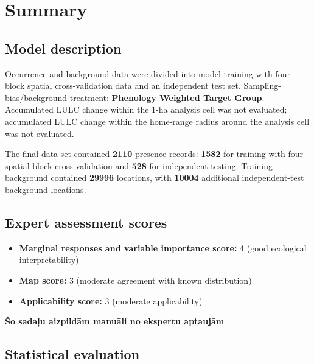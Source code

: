 \documentclass[
  openany]{book}
\providecommand{\tightlist}{%
  \setlength{\itemsep}{0pt}\setlength{\parskip}{0pt}}
\providecommand{\tightlist}{%
  \setlength{\itemsep}{0pt}%
  \setlength{\parskip}{0pt}%
}
\begin{document}
\section*{Summary}\label{summary-21}

\subsection*{Model description}\label{model-description-21}

Occurrence and background data were divided into model-training with four block spatial cross-validation data and an independent test set. Sampling-bias/background treatment: \textbf{Phenology Weighted Target Group}. Accumulated LULC change within the 1-ha analysis cell was not evaluated; accumulated LULC change within the home-range radius around the analysis cell was not evaluated.

The final data set contained \textbf{2110} presence records: \textbf{1582} for training with four spatial block cross-validation and \textbf{528} for independent testing. Training background contained \textbf{29996} locations, with \textbf{10004} additional independent-test background locations.

\subsection*{Expert assessment scores}\label{expert-assessment-scores-21}

\begin{itemize}
\tightlist
\item
  \textbf{Marginal responses and variable importance score:} 4 (good ecological interpretability)
\item
  \textbf{Map score:} 3 (moderate agreement with known distribution)
\item
  \textbf{Applicability score:} 3 (moderate applicability)
\end{itemize}

\textbf{Šo sadaļu aizpildām manuāli no ekspertu aptaujām}

\subsection*{Statistical evaluation}\label{statistical-evaluation-21}
\end{document}
